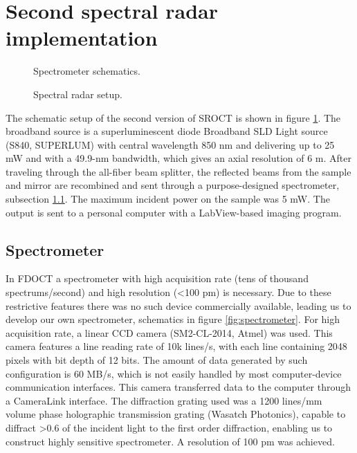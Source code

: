 \documentclass[12pt,twoside,english]{book}
\renewcommand{\~}{\perispomeni}%
\DeclareRobustCommand{\textgreek}[1]{\leavevmode{\greektext #1}}
\numberwithin{equation}{section}
\numberwithin{figure}{section}
\begin{document}
\section{Second spectral radar implementation}
\begin{figure}[h]
\small
\begin{minipage}[t]{0.48\textwidth}

\caption{Spectrometer schematics.}
\label{fig:spectrometer}
\end{minipage}
\hfill
\begin{minipage}[t]{0.48\textwidth}

\caption{Spectral radar setup.}
\label{fig:SROCT setup 2}
\end{minipage}
\end{figure}
The schematic setup of the second version of SROCT is shown in figure \ref{fig:SROCT setup 2}.  The broadband source is a superluminescent diode Broadband SLD Light source (S840, SUPERLUM) with central wavelength 850 nm and delivering up to 25 mW and with a 49.9-nm bandwidth, which gives an axial resolution of 6 \textgreek{m}m. After traveling through the all-fiber beam splitter, the reflected beams from the sample and mirror are recombined and sent through a purpose-designed spectrometer, subsection \ref{sub:spectrometer}. The maximum incident power on the sample was 5 mW. The output is sent to a personal computer with a LabView-based imaging program. 

\subsection{Spectrometer}
\label{sub:spectrometer}
In FDOCT a spectrometer with high acquisition rate (tens of thousand spectrums/second) and high resolution (<100 pm) is necessary. Due to these restrictive features there was no such device commercially available, leading us to develop our own spectrometer, schematics in figure \ref{fig:spectrometer}. For high acquisition rate, a linear CCD camera (SM2-CL-2014, Atmel) was used. This camera features a line reading rate of 10k lines/s, with each line containing 2048 pixels with bit depth of 12 bits. The amount of data generated by such configuration is 60 MB/s, which is not easily handled by most computer-device communication interfaces. This camera transferred data to the computer through a CameraLink interface. The diffraction grating used was a 1200 lines/mm volume phase holographic transmission grating (Wasatch Photonics), capable to diffract >0.6 of the incident light to the first order diffraction, enabling us to construct highly sensitive spectrometer. A resolution of 100 pm was achieved.
\end{document}
